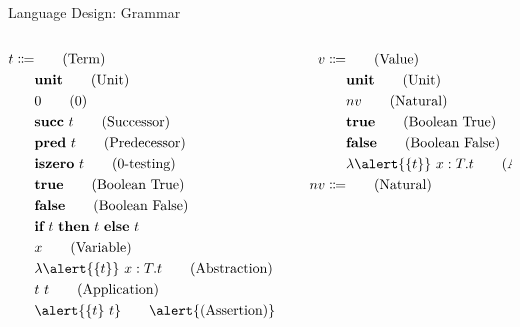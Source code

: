 \documentclass[handout]{beamer}
\begin{document}
\begin{frame}{Language Design: Grammar}

\scriptsize

\begin{columns}
\begin{column}{0.45\textwidth}
\begin{align*}
    t \Coloneqq &                           \tag{Term} \\
        & \textbf{unit}                     \tag{Unit} \\
        & 0                                 \tag{0} \\
        & \textbf{succ} \ t                 \tag{Successor} \\
        & \textbf{pred} \ t                 \tag{Predecessor} \\
        & \textbf{iszero} \ t               \tag{0-testing} \\
        & \textbf{true}                     \tag{Boolean True} \\
        & \textbf{false}                    \tag{Boolean False} \\
        & \textbf{if} \ t \ \textbf{then} \ t \ \textbf{else} \ t & \tag{Condition} \\
        & x                                 \tag{Variable} \\
        & \lambda \alert{\qty{t}} \ x : T . t \tag{Abstraction} \\
        & t \ t                             \tag{Application} \\
        & \alert{\qty{t} \ t}               \tag*{\alert{(Assertion)}}
\end{align*}
\end{column}
\begin{column}{0.5\textwidth}
\begin{align*}
    v \Coloneqq &                           \tag{Value} \\
        & \textbf{unit}                     \tag{Unit} \\
        & nv                                \tag{Natural} \\
        & \textbf{true}                     \tag{Boolean True} \\
        & \textbf{false}                    \tag{Boolean False} \\
        & \lambda \alert{\qty{t}} \ x : T . t \tag{Abstraction} \\
    nv \Coloneqq &                          \tag{Natural} \\

\end{align*}
\end{column}
\end{columns}
\end{frame}
\end{document}
